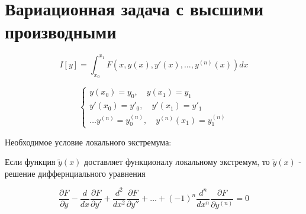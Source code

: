 \documentclass[12pt, a4paper]{report}
\begin{document}
\fi


\section{ Вариационная задача с высшими производными }

\[ I[y ]= \int_{x_0 }^{x_1 } F( x, y (x), y' (x),..., y ^{(n )} (x))  dx\]  

\[ \begin{cases}
    y(x_0) = y_0 ,\quad  y (x_1) = y_1 \\
    y ' (x_0) = y ' _0 , \quad y ' (x_1) = y ' _1 \\
    \ldots 
    y^{(n )} = y^{(n )}_0, \quad y^{(n )} (x_1) = y^{(n )}_1
\end{cases} \]  

Необходимое условие локального экстремума: 

Если функция \( \tilde{y }(x ) \)  доставляет функционалу локальному экстремум, то \( \tilde{ y }(x) \)  - решение диффернциального уравнения

\[ \frac{\partial  F }{\partial  y } - \frac{d}{dx } \frac{ \partial  F }{\partial  y ' } + \frac{d ^2 }{dx ^2 } \frac{\partial  F }{\partial  y ''} + \ldots + (-1 )^{n}  \frac{d ^n }{dx ^n } \frac{\partial  F }{\partial  y ^{(n )}} = 0    \] 
\end{document}
